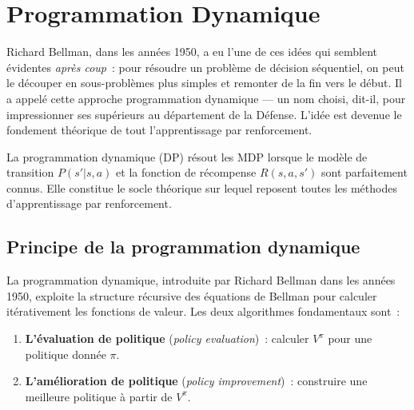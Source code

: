 \chapter{Programmation Dynamique}
\label{ch:programmation_dynamique}

Richard Bellman, dans les ann\'ees 1950, a eu l'une de ces id\'ees qui
semblent \'evidentes \emph{apr\`es coup}~: pour r\'esoudre un probl\`eme de
d\'ecision s\'equentiel, on peut le d\'ecouper en sous-probl\`emes plus simples
et remonter de la fin vers le d\'ebut. Il a appel\'e cette approche
\og programmation dynamique\fg{} --- un nom choisi, dit-il, pour impressionner
ses sup\'erieurs au d\'epartement de la D\'efense. L'id\'ee est devenue le
fondement th\'eorique de tout l'apprentissage par renforcement.

\begin{intuition}
La programmation dynamique (DP) r\'esout les MDP lorsque le mod\`ele de transition
$P(s'|s,a)$ et la fonction de r\'ecompense $R(s,a,s')$ sont parfaitement connus.
Elle constitue le socle th\'eorique sur lequel reposent toutes les m\'ethodes
d'apprentissage par renforcement.
\end{intuition}

\section{Principe de la programmation dynamique}

La programmation dynamique, introduite par Richard Bellman dans les ann\'ees 1950,
exploite la structure r\'ecursive des \'equations de Bellman pour calculer it\'erativement
les fonctions de valeur. Les deux algorithmes fondamentaux sont~:
\begin{enumerate}
    \item \textbf{L'\'evaluation de politique} (\emph{policy evaluation})~: calculer
    $V^\pi$ pour une politique donn\'ee $\pi$.
    \item \textbf{L'am\'elioration de politique} (\emph{policy improvement})~:
    construire une meilleure politique \`a partir de $V^\pi$.
\end{enumerate}

